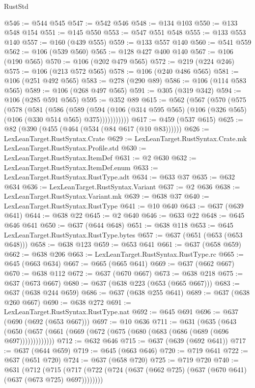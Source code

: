 \begin{lexlean}{RustStd}
\begin{coremodule}
@546 := @544 @545
@547 := @542 @546
@548 := @134 @103
@550 := @133 @548 @154
@551 := @145 @550
@553 := @547 @551 @548
@555 := @133 @553 @140
@557 := @160 (@439 @555)
@559 := @133 @557 @140
@560 := @541 @559
@562 := @106 (@539 @560)
@565 := @128 @427 @400 @140
@567 := @106 (@190 @565)
@570 := @106 (@202 @479 @565)
@572 := @219 (@224 @246)
@575 := @106 (@213 @572 @565)
@578 := @106 (@240 @486 @565)
@581 := @106 (@251 @492 @565)
@583 := @278 (@290 @89)
@586 := @106 (@114 @583 @565)
@589 := @106 (@268 @497 @565)
@591 := @305 (@319 @342)
@594 := @106 (@285 @591 @565)
@595 := @352 @89
@615 := @562
    (@567
      (@570
        (@575
          (@578
            (@581
              (@586
                (@589
                  (@594
                    (@106 (@314 @595 @565) (@106 (@326 @565) (@106 (@330 @514 @565) @375)))))))))))
@617 := @459 (@537 @615)
@625 := @82 (@390 (@455 (@464 (@534 (@84 @617 (@10 @83))))))
@626 := LexLeanTarget.RustSyntax.Crate
@629 := LexLeanTarget.RustSyntax.Crate.mk LexLeanTarget.RustSyntax.Profile.std
@630 := LexLeanTarget.RustSyntax.ItemDef
@631 := @2 @630
@632 := LexLeanTarget.RustSyntax.ItemDef.enum
@633 := LexLeanTarget.RustSyntax.RustType.adt
@634 := @633 @37
@635 := @632 @634
@636 := LexLeanTarget.RustSyntax.Variant
@637 := @2 @636
@638 := LexLeanTarget.RustSyntax.Variant.mk
@639 := @638 @37
@640 := LexLeanTarget.RustSyntax.RustType
@641 := @10 @640
@643 := @637 (@639 @641)
@644 := @638 @22
@645 := @2 @640
@646 := @633 @22
@648 := @645 @646 @641
@650 := @637 (@644 @648)
@651 := @638 @118
@653 := @645 LexLeanTarget.RustSyntax.RustType.bytes
@657 := @637 (@651 (@653 (@653 @648)))
@658 := @638 @123
@659 := @653 @641
@661 := @637 (@658 @659)
@662 := @638 @206
@663 := LexLeanTarget.RustSyntax.RustType.rc
@665 := @645 (@663 @634)
@667 := @665 (@665 @641)
@669 := @637 (@662 @667)
@670 := @638 @112
@672 := @637 (@670 @667)
@673 := @638 @218
@675 := @637 (@673 @667)
@680 := @637 (@638 @223 (@653 (@665 @667)))
@683 := @637 (@638 @244 @659)
@686 := @637 (@638 @255 @641)
@689 := @637 (@638 @260 @667)
@690 := @638 @272
@691 := LexLeanTarget.RustSyntax.RustType.nat
@692 := @645 @691
@696 := @637 (@690 (@692 (@653 @667)))
@697 := @10 @636
@711 := @631
    (@635 (@643 (@650 (@657 (@661 (@669 (@672 (@675 (@680 (@683 (@686 (@689 (@696 @697)))))))))))))
@712 := @632 @646
@715 := @637 (@639 (@692 @641))
@717 := @637 (@644 @659)
@719 := @645 (@663 @646)
@720 := @719 @641
@722 := @637 (@651 @720)
@724 := @637 (@658 @720)
@725 := @719 @720
@740 := @631
    (@712 (@715 (@717 (@722 (@724 (@637 (@662 @725) (@637 (@670 @641) (@637 (@673 @725) @697))))))))

\end{coremodule}
\end{lexlean}
